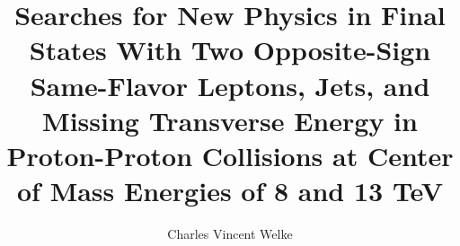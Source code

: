 \title{Searches for New Physics in Final States With Two Opposite-Sign Same-Flavor Leptons, Jets, and Missing Transverse Energy in Proton-Proton Collisions at Center of Mass Energies of 8 and 13 TeV}

\author{Charles Vincent Welke}





